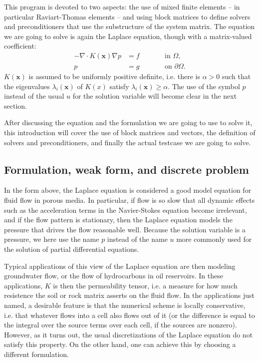 \documentclass{article}
\renewcommand{\vec}[1]{\mathbf{#1}}
\begin{document}
This program is devoted to two aspects: the use of mixed finite elements -- in
particular Raviart-Thomas elements -- and using block matrices to define
solvers and preconditioners that use the substructure of the system
matrix. The equation we are going to solve is again the Laplace equation,
though with a matrix-valued coefficient:
\begin{align*}
  -\nabla \cdot K(\vec x) \nabla p &= f \qquad && \text{in $\Omega$}, \\
  p &= g && \text{on $\partial\Omega$}.
\end{align*}
$K(\vec x)$ is assumed to be uniformly positive definite, i.e. there is
$\alpha>0$ such that the eigenvalues $\lambda_i(\vec x)$ of $K(x)$ satisfy
$\lambda_i(\vec x)\ge \alpha$. The use of the symbol $p$ instead of the usual
$u$ for the solution variable will become clear in the next section.

After discussing the equation and the formulation we are going to use to solve
it, this introduction will cover the use of block matrices and vectors, the
definition of solvers and preconditioners, and finally the actual testcase we
are going to solve.

\subsection*{Formulation, weak form, and discrete problem}

In the form above, the Laplace equation is considered a good model equation
for fluid flow in porous media. In particular, if flow is so slow that all
dynamic effects such as the acceleration terms in the Navier-Stokes equation
become irrelevant, and if the flow pattern is stationary, then the Laplace
equation models the pressure that drives the flow reasonable well. Because the
solution variable is a pressure, we here use the name $p$ instead of the
name $u$ more commonly used for the solution of partial differential equations.

Typical applications of this view of the Laplace equation are then modeling
groundwater flow, or the flow of hydrocarbons in oil reservoirs. In these
applications, $K$ is then the permeability tensor, i.e. a measure for how much
resistence the soil or rock matrix asserts on the fluid flow. In the
applications just named, a desirable feature is that the numerical scheme is
locally conservative, i.e. that whatever flows into a cell also flows out of
it (or the difference is equal to the integral over the source terms over each
cell, if the sources are nonzero). However, as it turns out, the usual
discretizations of the Laplace equation do not satisfy this property. On the
other hand, one can achieve this by choosing a different formulation.
\end{document}
